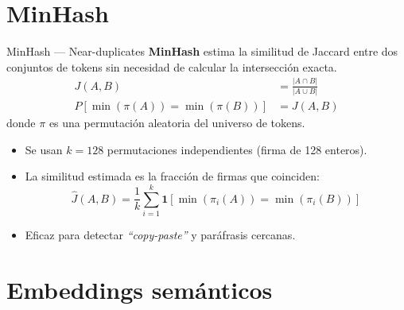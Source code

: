 \documentclass[aspectratio=169]{beamer}
\begin{document}
\section{MinHash}

\begin{frame}{MinHash — Near-duplicates}
  \textbf{MinHash} estima la similitud de Jaccard entre dos conjuntos de tokens sin necesidad de calcular la intersección exacta.
  \vspace{0.5em}
  \begin{align*}
    J(A, B) &= \frac{|A \cap B|}{|A \cup B|} \\[0.5em]
    P[\min(\pi(A)) = \min(\pi(B))] &= J(A, B)
  \end{align*}
  donde $\pi$ es una permutación aleatoria del universo de tokens.
  \vspace{0.5em}
  \begin{itemize}
    \item Se usan $k = 128$ permutaciones independientes (firma de 128 enteros).
    \item La similitud estimada es la fracción de firmas que coinciden:
          \[
          \hat{J}(A, B) = \frac{1}{k} \sum_{i=1}^{k} \mathbf{1}[\min(\pi_i(A)) = \min(\pi_i(B))]
          \]
    \item Eficaz para detectar \textit{``copy-paste''} y paráfrasis cercanas.
  \end{itemize}
\end{frame}

\section{Embeddings semánticos}
\end{document}

